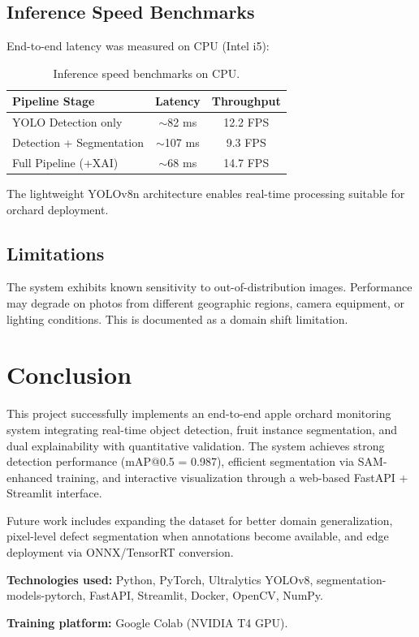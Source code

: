 \documentclass[12pt,a4paper]{article}
\begin{document}
\subsection{Inference Speed Benchmarks}

End-to-end latency was measured on CPU (Intel i5):

\begin{table}[h]
\centering
\begin{tabular}{lcc}
\toprule
\textbf{Pipeline Stage} & \textbf{Latency} & \textbf{Throughput} \\
\midrule
YOLO Detection only & $\sim$82 ms & 12.2 FPS \\
Detection + Segmentation & $\sim$107 ms & 9.3 FPS \\
Full Pipeline (+XAI) & $\sim$68 ms & 14.7 FPS \\
\bottomrule
\end{tabular}
\caption{Inference speed benchmarks on CPU.}
\end{table}

The lightweight YOLOv8n architecture enables real-time processing suitable for orchard deployment.

\subsection{Limitations}

The system exhibits known sensitivity to out-of-distribution images. Performance may degrade on photos from different geographic regions, camera equipment, or lighting conditions. This is documented as a domain shift limitation.

\section{Conclusion}

This project successfully implements an end-to-end apple orchard monitoring system integrating real-time object detection, fruit instance segmentation, and dual explainability with quantitative validation. The system achieves strong detection performance (mAP@0.5 = 0.987), efficient segmentation via SAM-enhanced training, and interactive visualization through a web-based FastAPI + Streamlit interface.

Future work includes expanding the dataset for better domain generalization, pixel-level defect segmentation when annotations become available, and edge deployment via ONNX/TensorRT conversion.

\vspace{1cm}
\noindent\textbf{Technologies used:} Python, PyTorch, Ultralytics YOLOv8, segmentation-models-pytorch, FastAPI, Streamlit, Docker, OpenCV, NumPy.

\vspace{0.5cm}
\noindent\textbf{Training platform:} Google Colab (NVIDIA T4 GPU).
\end{document}
